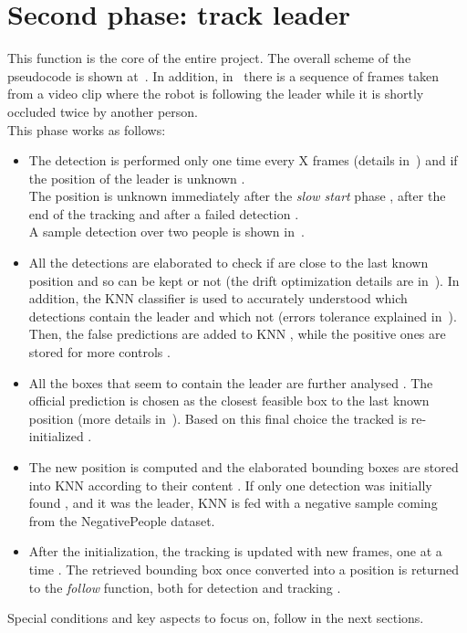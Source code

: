 \section{Second phase: track leader} \label{sec:trackleaderPhase}
This function is the core of the entire project. The overall scheme of the pseudocode is shown at~. In addition, in~ there is a sequence of frames taken from a video clip where the robot is following the leader while it is shortly occluded twice by another person.\\
This phase works as follows:\\
\begin{itemize}
	\item The detection is performed  only one time every X frames (details in~) and if the position of the leader is unknown .\\
	The position is unknown immediately after the \textit{slow start} phase , after the end of the tracking  and after a failed detection .\\
	A sample detection over two people is shown in~.
	
	\item All the detections are elaborated  to check if are close to the last known position  and so can be kept or not (the drift optimization details are in~). In addition, the KNN classifier is used  to accurately understood which detections contain the leader and which not (errors tolerance explained in~).\\
	Then, the false predictions are added to KNN , while the positive ones are stored for more controls .
	
	\item All the boxes that seem to contain the leader are further analysed . The official prediction is chosen as the closest feasible box to the last known position  (more details in~). Based on this final choice the tracked is re-initialized .
	
	\item The new position is computed  and the elaborated bounding boxes are stored into KNN according to their content . If only one detection was initially found , and it was the leader, KNN is fed with a negative sample  coming from the NegativePeople dataset.
	
	\item After the initialization, the tracking is updated with new frames, one at a time . The retrieved bounding box once converted into a position  is returned to the \textit{follow} function, both for detection and tracking .
\end{itemize}
Special conditions and key aspects to focus on, follow in the next sections.

